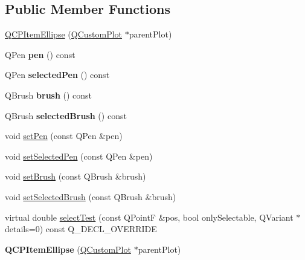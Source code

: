 \subsection*{Public Member Functions}
\begin{DoxyCompactItemize}
\item 
\hyperlink{class_q_c_p_item_ellipse_a759b77ef002515eba0263b5447ecb3fb}{Q\+C\+P\+Item\+Ellipse} (\hyperlink{class_q_custom_plot}{Q\+Custom\+Plot} $\ast$parent\+Plot)
\item 
\mbox{\label{class_q_c_p_item_ellipse_a8288f7ce760fc795f5ce4e61136bda19}} 
Q\+Pen {\bfseries pen} () const
\item 
\mbox{\label{class_q_c_p_item_ellipse_a9a200af2797356b45479b601d75437ee}} 
Q\+Pen {\bfseries selected\+Pen} () const
\item 
\mbox{\label{class_q_c_p_item_ellipse_aacf45d032f204d0df3dd0bfdf1172cd3}} 
Q\+Brush {\bfseries brush} () const
\item 
\mbox{\label{class_q_c_p_item_ellipse_afeda9d8e2e6da216a3c3366d87e80feb}} 
Q\+Brush {\bfseries selected\+Brush} () const
\item 
void \hyperlink{class_q_c_p_item_ellipse_adb81a663ed2420fcfa011e49f678d1a6}{set\+Pen} (const Q\+Pen \&pen)
\item 
void \hyperlink{class_q_c_p_item_ellipse_a6c542fba1dc918041c583f58a50dde99}{set\+Selected\+Pen} (const Q\+Pen \&pen)
\item 
void \hyperlink{class_q_c_p_item_ellipse_a49fc74e6965834e873d027d026def798}{set\+Brush} (const Q\+Brush \&brush)
\item 
void \hyperlink{class_q_c_p_item_ellipse_a9693501cfaa43a099655c75bed0dab3f}{set\+Selected\+Brush} (const Q\+Brush \&brush)
\item 
virtual double \hyperlink{class_q_c_p_item_ellipse_ab6e2b8a29695c606c7731e498297ca29}{select\+Test} (const Q\+PointF \&pos, bool only\+Selectable, Q\+Variant $\ast$details=0) const Q\+\_\+\+D\+E\+C\+L\+\_\+\+O\+V\+E\+R\+R\+I\+DE
\item 
\mbox{\label{class_q_c_p_item_ellipse_a759b77ef002515eba0263b5447ecb3fb}} 
{\bfseries Q\+C\+P\+Item\+Ellipse} (\hyperlink{class_q_custom_plot}{Q\+Custom\+Plot} $\ast$parent\+Plot)

\end{DoxyCompactItemize}
